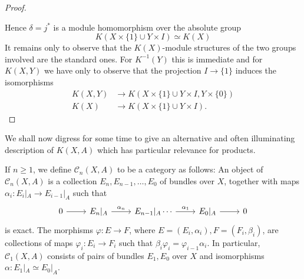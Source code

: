 \documentclass[leqno]{book}
\numberwithin{equation}{section}
\theoremstyle{definition}
\begin{document}
\begin{proof}
\begin{figure*}[htbp]
              \end{figure*}
              Hence $\delta=j^{*}$ is a module homomorphism over the absolute group
              \begin{equation*}
                K(X\times \{1\}\cup Y\times I)\simeq K(X)
              \end{equation*}
              It remains only to observe that the $K(X)$-module structures of the two groups involved are the standard ones. For $K^{-1}(Y)$ this is immediate and for $K(X,Y)$ we have only to observe that the projection $I\to \{1\}$ induces the isomorphisms
              \begin{equation*}
                \begin{aligned}
                K(X,Y) &\to K(X\times \{1\}\cup Y\times I,Y\times \{0\}) \\
                K(X) &\to K(X\times \{1\}\cup Y\times I).
                \end{aligned}
              \end{equation*}
            \end{proof}

            \noindent We shall now digress for some time to give an alternative and often illuminating description of $K(X,A)$ which has particular relevance for products.
            
            If $n\ge 1$, we define $\mathcal{C}_{n}(X,A)$ to be a category as follows: An object of $\mathcal{C}_{n}(X,A)$ is a collection $E_{n},E_{n-1}, \ldots ,E_0$ of bundles over $X$, together with maps $\alpha _{i}:E_{i}|_{A}\to E_{i-1}|_{A}$ such that
            \begin{equation*}
              \begin{tikzcd}
                0\arrow[r] & E_{n}|_{A} \arrow[r, "\alpha _{n}"] & E_{n-1} |_{A} \cdots \arrow[r, "\alpha_1"] & E_{0}|_{A}\arrow[r] & 0
              \end{tikzcd}
            \end{equation*}
            is exact. The morphisms $\varphi :E\to F$, where $E=(E_{i},\alpha _{i}), F=(F_{i},\beta_{i})$, are collections of maps $\varphi _{i}:E_{i}\to F_{i}$ such that $\beta_{i}\varphi_{i}=\varphi_{i-1}\alpha _{i}$. In particular, $\mathcal{C}_{1}(X,A)$ consists of pairs of bundles $E_1,E_0$ over $X$ and isomorphisms $\alpha:E_1|_{A}\simeq E_0|_{A}$.
\end{document}
